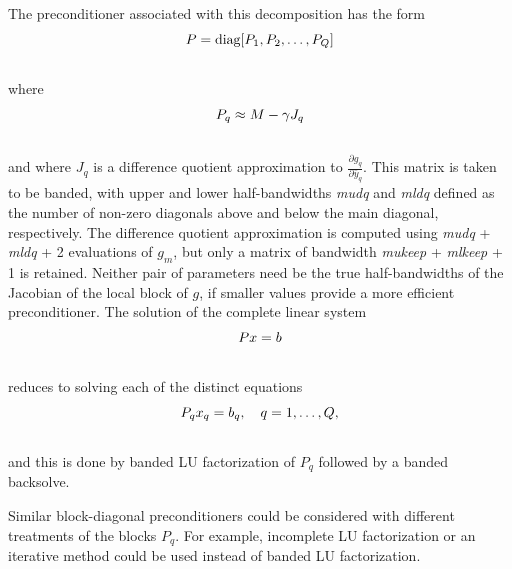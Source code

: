 \documentclass[letterpaper,10pt,english]{sphinxmanual}
\begin{document}
The preconditioner associated with this decomposition has the form
\begin{gather}
\begin{split}P = \text{diag}[P_1, P_2, \ldots, P_Q]\end{split}\notag\\\begin{split}\end{split}\notag
\end{gather}
where
\begin{gather}
\begin{split}P_q \approx M - \gamma J_q\end{split}\notag\\\begin{split}\end{split}\notag
\end{gather}
and where $J_q$ is a difference quotient approximation to
$\frac{\partial g_q}{\partial \bar{y}_q}$.  This matrix is taken
to be banded, with upper and lower half-bandwidths \emph{mudq} and
\emph{mldq} defined as the number of non-zero diagonals above and below
the main diagonal, respectively.  The difference quotient
approximation is computed using \emph{mudq} + \emph{mldq} + 2 evaluations of
$g_m$, but only a matrix of bandwidth \emph{mukeep} + \emph{mlkeep} + 1 is
retained. Neither pair of parameters need be the true half-bandwidths
of the Jacobian of the local block of $g$, if smaller values
provide a more efficient preconditioner. The solution of the complete
linear system
\begin{gather}
\begin{split}Px = b\end{split}\notag\\\begin{split}\end{split}\notag
\end{gather}
reduces to solving each of the distinct equations
\begin{gather}
\begin{split}P_q x_q = b_q, \quad q=1,\ldots,Q,\end{split}\notag\\\begin{split}\end{split}\notag
\end{gather}
and this is done by banded LU factorization of $P_q$ followed by
a banded backsolve.

Similar block-diagonal preconditioners could be considered with
different treatments of the blocks $P_q$.  For example,
incomplete LU factorization or an iterative method could be used
instead of banded LU factorization.
\end{document}
